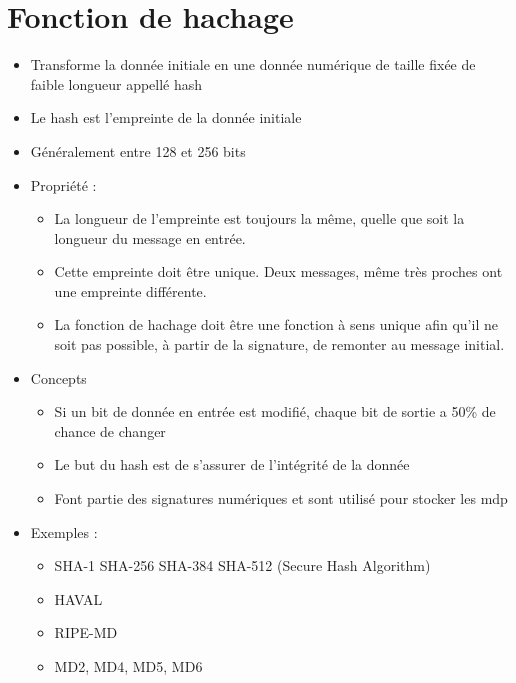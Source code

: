 \documentclass[a4paper]{article}
\begin{document}
\section{Fonction de hachage}
\begin{itemize}[label=\textbullet, font=\Large]
    \item Transforme la donnée initiale en une donnée numérique de taille fixée de faible longueur appellé hash
    \item Le hash est l'empreinte de la donnée initiale
    \item Généralement entre 128 et 256 bits
    \item Propriété :
    \begin{itemize}[label=, font=\scriptsize]
        \item La longueur de l’empreinte est toujours la même, quelle que soit la longueur du
        message en entrée.
        \item Cette empreinte doit être unique. Deux messages, même très proches ont une
        empreinte différente.
        \item La fonction de hachage doit être une fonction à sens unique afin qu’il ne soit pas
        possible, à partir de la signature, de remonter au message initial.
    \end{itemize}
    \item Concepts
    \begin{itemize}[label=, font=\scriptsize]
        \item Si un bit de donnée en entrée est modifié, chaque bit de sortie a
        50\% de chance de changer
        \item Le but du hash est de s'assurer de l'intégrité de la donnée
        \item Font partie des signatures numériques et sont utilisé pour stocker les mdp
    \end{itemize}
    \item Exemples :
    \begin{itemize}[label=, font=\scriptsize]
        \item SHA-1 SHA-256 SHA-384 SHA-512 (Secure Hash Algorithm)
        \item HAVAL
        \item RIPE-MD
        \item MD2, MD4, MD5, MD6
    \end{itemize}
\end{itemize}
\end{document}
